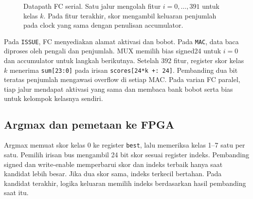 \begin{figure}[H]
\centering
{}
\caption{Datapath FC serial. Satu jalur mengolah fitur \(i=0,\ldots,391\) untuk kelas \(k\). Pada fitur terakhir, skor mengambil keluaran penjumlah pada clock yang sama dengan penulisan accumulator.}
\label{fig:hw-fc}
\end{figure}

Pada \texttt{ISSUE}, FC menyediakan alamat aktivasi dan bobot. Pada
\texttt{MAC}, data baca diproses oleh pengali dan penjumlah.
MUX memilih bias signed24 untuk \(i=0\) dan accumulator untuk
langkah berikutnya. Setelah 392 fitur, register skor kelas \(k\)
menerima \texttt{sum[23:0]} pada irisan \texttt{scores[24*k +: 24]}.
Pembanding dua bit teratas penjumlah mengawasi overflow di setiap MAC.
Pada varian FC paralel, tiap jalur mendapat aktivasi yang sama dan
membaca bank bobot serta bias untuk kelompok kelasnya sendiri.

\clearpage
\subsection{Argmax dan pemetaan ke FPGA}
Argmax memuat skor kelas 0 ke register \texttt{best}, lalu memeriksa
kelas 1--7 satu per satu. Pemilih irisan bus mengambil 24 bit skor
sesuai register indeks. Pembanding signed dan write-enable memperbarui
skor dan indeks terbaik hanya saat kandidat lebih besar. Jika dua skor
sama, indeks terkecil bertahan. Pada kandidat terakhir, logika keluaran
memilih indeks berdasarkan hasil pembanding saat itu.

